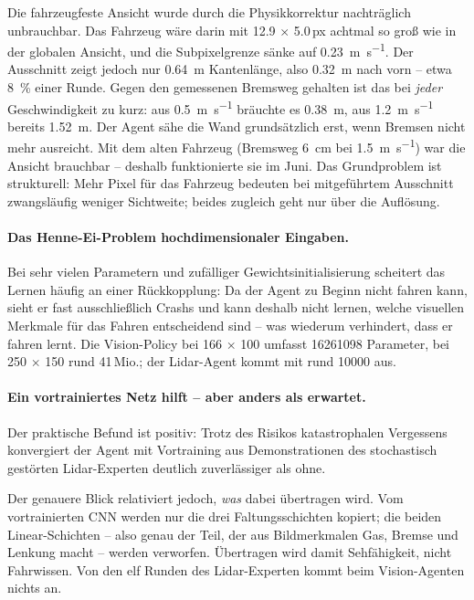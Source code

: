 Die fahrzeugfeste Ansicht wurde durch die Physikkorrektur nachträglich unbrauchbar. Das Fahrzeug wäre darin mit \num{12.9} $\times$ \num{5.0}\,px achtmal so groß wie in der globalen Ansicht, und die Subpixelgrenze sänke auf \SI{0.23}{\meter\per\second}. Der Ausschnitt zeigt jedoch nur \SI{0.64}{\meter} Kantenlänge, also \SI{0.32}{\meter} nach vorn -- etwa \SI{8}{\percent} einer Runde. Gegen den gemessenen Bremsweg gehalten ist das bei \emph{jeder} Geschwindigkeit zu kurz: aus \SI{0.5}{\meter\per\second} bräuchte es \SI{0.38}{\meter}, aus \SI{1.2}{\meter\per\second} bereits \SI{1.52}{\meter}. Der Agent sähe die Wand grundsätzlich erst, wenn Bremsen nicht mehr ausreicht. Mit dem alten Fahrzeug (Bremsweg \SI{6}{\centi\meter} bei \SI{1.5}{\meter\per\second}) war die Ansicht brauchbar -- deshalb funktionierte sie im Juni. Das Grundproblem ist strukturell: Mehr Pixel für das Fahrzeug bedeuten bei mitgeführtem Ausschnitt zwangsläufig weniger Sichtweite; beides zugleich geht nur über die Auflösung.

\paragraph{Das Henne-Ei-Problem hochdimensionaler Eingaben.}
Bei sehr vielen Parametern und zufälliger Gewichtsinitialisierung scheitert das Lernen häufig an einer Rückkopplung: Da der Agent zu Beginn nicht fahren kann, sieht er fast ausschließlich Crashs und kann deshalb nicht lernen, welche visuellen Merkmale für das Fahren entscheidend sind -- was wiederum verhindert, dass er fahren lernt. Die Vision-Policy bei \num{166} $\times$ \num{100} umfasst \num{16261098} Parameter, bei \num{250} $\times$ \num{150} rund \num{41}\,Mio.; der Lidar-Agent kommt mit rund \num{10000} aus.

\paragraph{Ein vortrainiertes Netz hilft -- aber anders als erwartet.}
\label{subsec:vortraining}
Der praktische Befund ist positiv: Trotz des Risikos katastrophalen Vergessens konvergiert der Agent mit Vortraining aus Demonstrationen des stochastisch gestörten Lidar-Experten deutlich zuverlässiger als ohne.

Der genauere Blick relativiert jedoch, \emph{was} dabei übertragen wird. Vom vortrainierten \ac{CNN} werden nur die drei Faltungsschichten kopiert; die beiden Linear-Schichten -- also genau der Teil, der aus Bildmerkmalen Gas, Bremse und Lenkung macht -- werden verworfen. Übertragen wird damit Sehfähigkeit, nicht Fahrwissen. Von den elf Runden des Lidar-Experten kommt beim Vision-Agenten nichts an.


